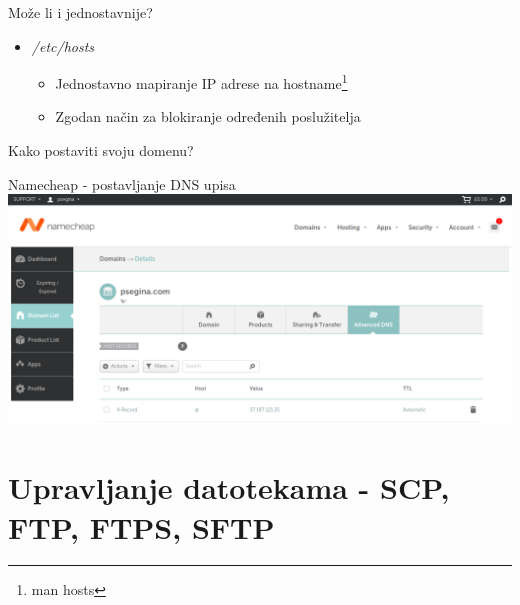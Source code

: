 \documentclass[t]{beamer}
\begin{document}
\begin{frame}[fragile]{Može li i jednostavnije?}
    \begin{itemize}
        \item \textit{/etc/hosts}
        \begin{itemize}
            \item Jednostavno mapiranje IP adrese na hostname\footnote{man hosts}
            \item Zgodan način za blokiranje određenih poslužitelja
        \end{itemize}
    \end{itemize}
\end{frame}

\begin{frame}
	\vspace*{\fill}
		\begin{center}
			\Huge{Kako postaviti svoju domenu?}
		\end{center}
	\vspace*{\fill}
\end{frame}

\begin{frame}{Namecheap - postavljanje DNS upisa}
    \includegraphics[width=\textwidth,keepaspectratio,center]{namecheap-dns.png}
\end{frame}

\section{Upravljanje datotekama - SCP, FTP, FTPS, SFTP}
\end{document}
